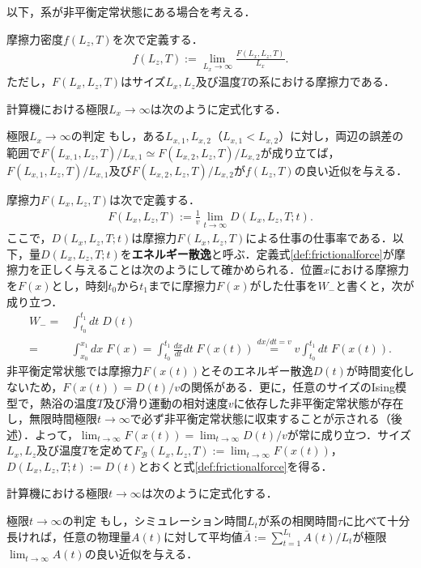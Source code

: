 \documentclass[a4paper]{jsarticle}
\begin{document}
	以下，系が非平衡定常状態にある場合を考える．
	
	摩擦力密度$f(L_{z}, T)$を次で定義する．
	\begin{align}
	f(L_{z}, T):=\lim_{L_{x}\to\infty}\frac{F(L_{x}, L_{z}, T)}{L_{x}}.
	\end{align}
	ただし，$F(L_{x}, L_{z}, T)$はサイズ$L_{x}, L_{z}$及び温度$T$の系における摩擦力である．
	
	計算機における極限$L_{x}\to\infty$は次のように定式化する．
	\begin{itembox}{極限$L_{x}\to\infty$の判定}
		もし，ある$L_{x, 1}, L_{x, 2}$（$L_{x, 1}<L_{x, 2}$）に対し，両辺の誤差の範囲で$F(L_{x, 1}, L_{z}, T)/L_{x, 1}\simeq F(L_{x, 2}, L_{z}, T)/L_{x, 2}$が成り立てば，$F(L_{x, 1}, L_{z}, T)/L_{x, 1}$及び$F(L_{x, 2}, L_{z}, T)/L_{x, 2}$が$f(L_{z}, T)$の良い近似を与える．
	\end{itembox}
	
	摩擦力$F(L_{x}, L_{z}, T)$は次で定義する．
	\begin{align}
	F(L_{x}, L_{z}, T):=\frac{1}{v}\lim_{t\to\infty}D(L_{x}, L_{z}, T; t)\label{def:frictionalforce}.
	\end{align}
	ここで，$D(L_{x}, L_{z}, T; t)$は摩擦力$F(L_{x}, L_{z}, T)$による仕事の仕事率である．以下，量$D(L_{x}, L_{z}, T; t)$を\textbf{エネルギー散逸}と呼ぶ．定義式\eqref{def:frictionalforce}が摩擦力を正しく与えることは次のようにして確かめられる．位置$x$における摩擦力を$F(x)$とし，時刻$t_{0}$から$t_{1}$までに摩擦力$F(x)$がした仕事を$W_{-}$と書くと，次が成り立つ．
	\begin{align}
	W_{-}=&\int_{t_{0}}^{t_{1}}dt\;D(t)\\
	=&\int_{x_{0}}^{x_{1}}dx\;F(x)=\int_{t_{0}}^{t_{1}}\frac{dx}{dt}dt\;F(x(t))\overset{dx/dt=v}{=}v\int_{t_{0}}^{t_{1}}dt\;F(x(t)).
	\end{align}
	非平衡定常状態では摩擦力$F(x(t))$とそのエネルギー散逸$D(t)$が時間変化しないため，$F(x(t))=D(t)/v$の関係がある．更に，任意のサイズのIsing模型で，熱浴の温度$T$及び滑り運動の相対速度$v$に依存した非平衡定常状態が存在し，無限時間極限$t\to\infty$で必ず非平衡定常状態に収束することが示される（後述）．よって，$\lim_{t\to\infty}F(x(t))=\lim_{t\to\infty}D(t)/v$が常に成り立つ．サイズ$L_{x}, L_{z}$及び温度$T$を定めて$F_{\mathcal{B}}(L_{x}, L_{z}, T):=\lim_{t\to\infty}F(x(t))$，$D(L_{x}, L_{z}, T; t):=D(t)$とおくと式\eqref{def:frictionalforce}を得る．
	
	計算機における極限$t\to\infty$は次のように定式化する．
	\begin{itembox}{極限$t\to\infty$の判定}
		もし，シミュレーション時間$L_{t}$が系の相関時間$\tau$に比べて十分長ければ，任意の物理量$A(t)$に対して平均値$\bar{A}:=\sum_{t=1}^{L_{t}}A(t)/L_{t}$が極限$\lim_{t\to\infty}A(t)$の良い近似を与える．
	\end{itembox}
	
\end{document}
